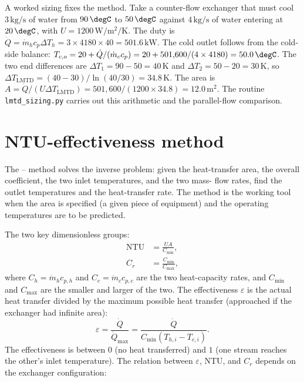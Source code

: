 A worked sizing fixes the method. Take a counter-flow exchanger that
must cool $3\,\text{kg/s}$ of water from $90\,\degC$ to $50\,\degC$
against $4\,\text{kg/s}$ of water entering at $20\,\degC$, with $U =
1200\,\si{\watt\per\meter\squared\per\kelvin}$. The duty is $\dot{Q}
= \dot{m}_h c_p \Delta T_h = 3 \times 4180 \times 40 = 501.6\,\text{kW}$.
The cold outlet follows from the cold-side balance: $T_{c,o} = 20 +
\dot{Q}/(\dot{m}_c c_p) = 20 + 501{,}600/(4 \times 4180) = 50.0\,\degC$.
The two end differences are $\Delta T_1 = 90 - 50 = 40\,\si{\kelvin}$
and $\Delta T_2 = 50 - 20 = 30\,\si{\kelvin}$, so $\Delta
T_{\text{LMTD}} = (40 - 30)/\ln(40/30) = 34.8\,\si{\kelvin}$. The area
is $A = \dot{Q}/(U \Delta T_{\text{LMTD}}) = 501{,}600/(1200 \times
34.8) = 12.0\,\text{m}^2$. The routine \texttt{lmtd\_sizing.py} carries
out this arithmetic and the parallel-flow comparison.

\section{NTU-effectiveness method}

The – method
solves the inverse problem: given the heat-transfer area, the
overall coefficient, the two inlet temperatures, and the two mass-
flow rates, find the outlet temperatures and the heat-transfer rate.
The method is the working tool when the area is specified (a given
piece of equipment) and the operating temperatures are to be
predicted.

The two key dimensionless groups:
\begin{align*}
\text{NTU} &= \frac{U A}{C_{\min}}, \\
C_r &= \frac{C_{\min}}{C_{\max}},
\end{align*}
where $C_h = \dot{m}_h c_{p,h}$ and $C_c = \dot{m}_c c_{p,c}$ are the
two heat-capacity rates, and $C_{\min}$ and $C_{\max}$ are the smaller
and larger of the two. The effectiveness $\varepsilon$ is the actual
heat transfer divided by the maximum possible heat transfer
(approached if the exchanger had infinite area):
\[
\varepsilon = \frac{\dot{Q}}{\dot{Q}_{\max}} = \frac{\dot{Q}}{C_{\min}
(T_{h,i} - T_{c,i})}.
\]
The effectiveness is between $0$ (no heat transferred) and $1$ (one
stream reaches the other's inlet temperature). The relation between
$\varepsilon$, NTU, and $C_r$ depends on the exchanger configuration:

